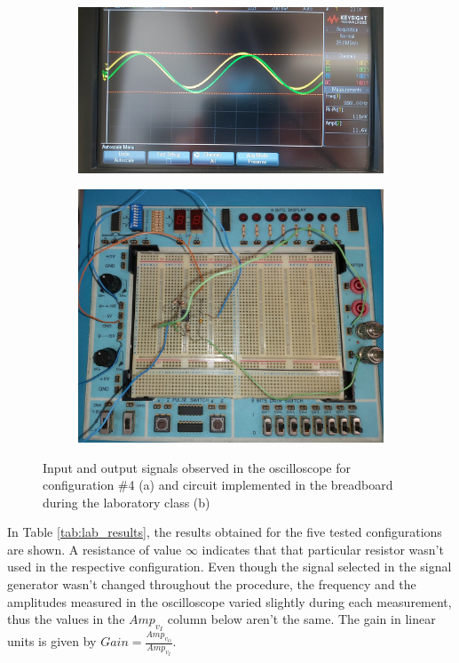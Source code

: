 \begin{figure}[H]
  \begin{subfigure}{.49\linewidth}
    \centering
    \includegraphics[width=0.95\linewidth]{../Oscilloscope4.jpeg}
    \footnotesize
  \end{subfigure}
  \hspace{5mm}
  \begin{subfigure}{.49\linewidth}
    \centering
    \includegraphics[width=0.90\linewidth]{../Breadboard.jpg}
  \end{subfigure}
  \caption{Input and output signals observed in the oscilloscope for configuration $\#$4 (a) and circuit implemented in the breadboard during the laboratory class (b)}
  \label{fig:oscilloscope_breadboard}
\end{figure}

In Table \ref{tab:lab_results}, the results obtained for the five tested configurations are shown. A resistance of value $\infty$ indicates that that particular resistor wasn't used in the respective configuration. Even though the signal selected in the signal generator wasn't changed throughout the procedure, the frequency and the amplitudes measured in the oscilloscope varied slightly during each measurement, thus the values in the $Amp_{v_I}$ column below aren't the same. The gain in linear units is given by $Gain=\frac{Amp_{v_O}}{Amp_{v_I}}$.

